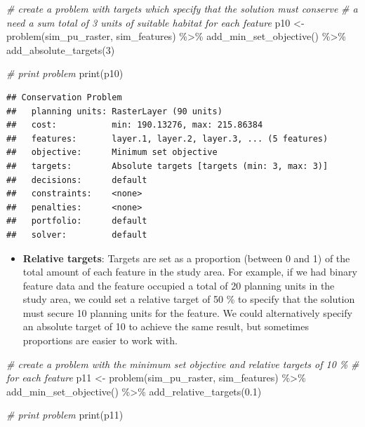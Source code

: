 \documentclass[
  12pt,
]{book}
\newenvironment{Shaded}{\begin{snugshade}}{\end{snugshade}}
\newcommand{\CommentTok}[1]{\textcolor[rgb]{0.56,0.35,0.01}{\textit{#1}}}
\newcommand{\DecValTok}[1]{\textcolor[rgb]{0.00,0.00,0.81}{#1}}
\newcommand{\FloatTok}[1]{\textcolor[rgb]{0.00,0.00,0.81}{#1}}
\newcommand{\FunctionTok}[1]{\textcolor[rgb]{0.00,0.00,0.00}{#1}}
\newcommand{\NormalTok}[1]{#1}
\newcommand{\OtherTok}[1]{\textcolor[rgb]{0.56,0.35,0.01}{#1}}
\newcommand{\SpecialCharTok}[1]{\textcolor[rgb]{0.00,0.00,0.00}{#1}}
\providecommand{\tightlist}{%
  \setlength{\itemsep}{0pt}\setlength{\parskip}{0pt}}
\begin{document}
\begin{Shaded}
\begin{Highlighting}[]
\CommentTok{\# create a problem with targets which specify that the solution must conserve}
\CommentTok{\# a need a sum total of 3 units of suitable habitat for each feature}
\NormalTok{p10 }\OtherTok{\textless{}{-}} \FunctionTok{problem}\NormalTok{(sim\_pu\_raster, sim\_features) }\SpecialCharTok{\%\textgreater{}\%}
  \FunctionTok{add\_min\_set\_objective}\NormalTok{() }\SpecialCharTok{\%\textgreater{}\%}
  \FunctionTok{add\_absolute\_targets}\NormalTok{(}\DecValTok{3}\NormalTok{)}

\CommentTok{\# print problem}
\FunctionTok{print}\NormalTok{(p10)}
\end{Highlighting}
\end{Shaded}

\begin{verbatim}
## Conservation Problem
##   planning units: RasterLayer (90 units)
##   cost:           min: 190.13276, max: 215.86384
##   features:       layer.1, layer.2, layer.3, ... (5 features)
##   objective:      Minimum set objective 
##   targets:        Absolute targets [targets (min: 3, max: 3)]
##   decisions:      default
##   constraints:    <none>
##   penalties:      <none>
##   portfolio:      default
##   solver:         default
\end{verbatim}

\begin{itemize}
\tightlist
\item
  \textbf{Relative targets}: Targets are set as a proportion (between 0 and 1) of the total amount of each feature in the study area. For example, if we had binary feature data and the feature occupied a total of 20 planning units in the study area, we could set a relative target of 50 \% to specify that the solution must secure 10 planning units for the feature. We could alternatively specify an absolute target of 10 to achieve the same result, but sometimes proportions are easier to work with.
\end{itemize}

\begin{Shaded}
\begin{Highlighting}[]
\CommentTok{\# create a problem with the minimum set objective and relative targets of 10 \%}
\CommentTok{\# for each feature}
\NormalTok{p11 }\OtherTok{\textless{}{-}} \FunctionTok{problem}\NormalTok{(sim\_pu\_raster, sim\_features) }\SpecialCharTok{\%\textgreater{}\%}
  \FunctionTok{add\_min\_set\_objective}\NormalTok{() }\SpecialCharTok{\%\textgreater{}\%}
  \FunctionTok{add\_relative\_targets}\NormalTok{(}\FloatTok{0.1}\NormalTok{)}

\CommentTok{\# print problem}
\FunctionTok{print}\NormalTok{(p11)}
\end{Highlighting}
\end{Shaded}
\end{document}
